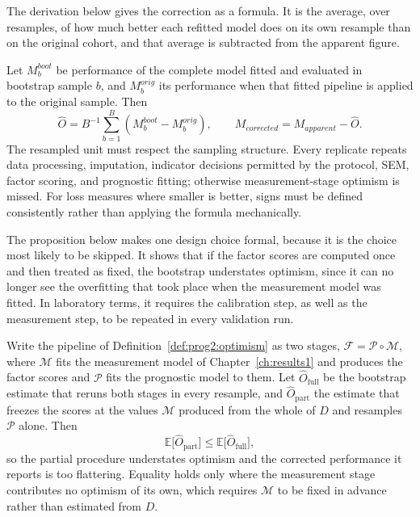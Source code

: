 The derivation below gives the correction as a formula. It is the average, over resamples, of how much better each refitted model does on its own resample than on the original cohort, and that average is subtracted from the apparent figure.

\begin{derivation}
\label{der:optimism}
Let $M_b^{boot}$ be performance of the complete model fitted and evaluated in
bootstrap sample $b$, and $M_b^{orig}$ its performance when that fitted pipeline
is applied to the original sample. Then
\[
 \widehat O=B^{-1}\sum_{b=1}^{B}(M_b^{boot}-M_b^{orig}),
 \qquad M_{corrected}=M_{apparent}-\widehat O.
\]
The resampled unit must respect the sampling structure. Every replicate repeats
data processing, imputation, indicator decisions permitted by the protocol, SEM,
factor scoring, and prognostic fitting; otherwise measurement-stage optimism is
missed. For loss measures where smaller is better, signs must be defined
consistently rather than applying the formula mechanically.
\end{derivation}

The proposition below makes one design choice formal, because it is the choice most likely to be skipped. It shows that if the factor scores are computed once and then treated as fixed, the bootstrap understates optimism, since it can no longer see the overfitting that took place when the measurement model was fitted. In laboratory terms, it requires the calibration step, as well as the measurement step, to be repeated in every validation run.

\begin{proposition}
\label{prop:prog2:refit}
Write the pipeline of Definition~\ref{def:prog2:optimism} as two stages,
$\mathcal F=\mathcal P\circ\mathcal M$, where $\mathcal M$ fits the measurement
model of Chapter~\ref{ch:results1} and produces the factor scores and
$\mathcal P$ fits the prognostic model to them. Let $\widehat O_{\mathrm{full}}$
be the bootstrap estimate that reruns both stages in every resample, and
$\widehat O_{\mathrm{part}}$ the estimate that freezes the scores at the values
$\mathcal M$ produced from the whole of $D$ and resamples $\mathcal P$ alone.
Then
\[
  \mathbb E\bigl[\widehat O_{\mathrm{part}}\bigr]
  \le\mathbb E\bigl[\widehat O_{\mathrm{full}}\bigr],
\]
so the partial procedure understates optimism and the corrected performance it
reports is too flattering. Equality holds only where the measurement stage
contributes no optimism of its own, which requires $\mathcal M$ to be fixed in
advance rather than estimated from $D$.
\end{proposition}


